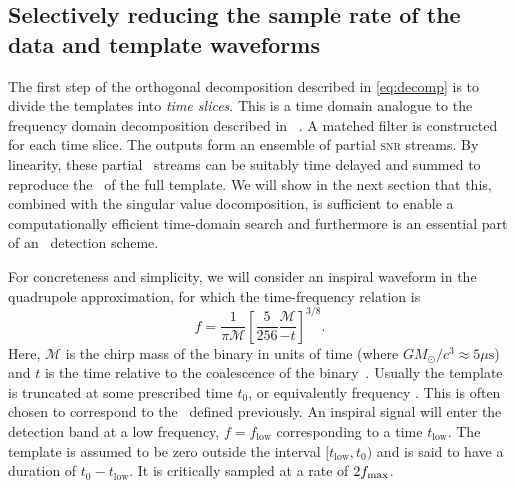 \subsection{Selectively reducing the sample rate of the data and template waveforms}

The first step of the orthogonal decomposition described in \eqref{eq:decomp}
is to divide the templates into \emph{time slices}.  This is a time domain
analogue to the frequency domain decomposition described in ~\cite{Marion2004,
Buskulic2010, beauville2006, beauville2008}.  A matched filter is constructed
for each time slice.  The outputs form an ensemble of partial \textsc{snr}
streams.  By linearity, these partial \SNR\ streams can be suitably time
delayed and summed to reproduce the \SNR\ of the full template.  We will show
in the next section that this, combined with the singular value docomposition,
is sufficient to enable a computationally efficient time-domain search and
furthermore is an essential part of an \earlywarning\ detection scheme.

For concreteness and simplicity, we will consider an inspiral waveform in the
quadrupole approximation, for which the time-frequency relation is
%
\begin{equation} \label{eq:fgw}
%
f = \frac{1}{\mathcal{\pi M}} \left[ \frac{5}{256}\frac{\mathcal{M}}{-t}
\right]^{3/8}.
%
\end{equation}
%
Here, $\mathcal{M}$ is the chirp mass of the binary in units of time (where $G
M_\odot / c^3 \approx 5 \mu\mathrm{s}$) and $t$ is the time relative to the
coalescence of the binary~\cite{findchirppaper, kidder1992}.  Usually the
template is truncated at some prescribed time $t_0$, or equivalently frequency \fmax.
This is often chosen to correspond to the \ISCO\ defined previously. An inspiral signal
will enter the detection band at a low frequency, $f = f_\mathrm{low}$
corresponding to a time $t_\mathrm{low}$.  The template is assumed to be zero
outside the interval $[t_\mathrm{low}, t_\mathrm{0})$ and is said to have  a
duration of $t_\mathrm{0} - t_\mathrm{low}$. It is critically sampled at a
rate of $2 f_{\mathrm{max}}$.  

